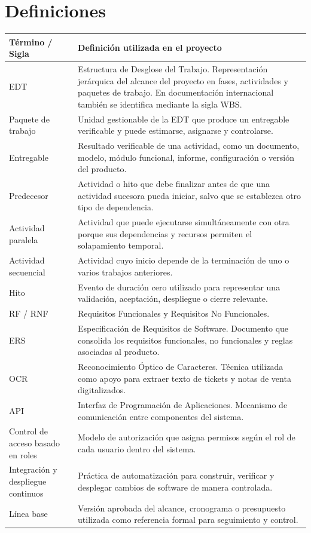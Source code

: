 \documentclass[12pt,a4paper]{article}
\begin{document}
\section{Definiciones}

\begin{longtable}{|p{4.0cm}|p{11.0cm}|}
\hline
\rowcolor{tableheader}
\textbf{Término / Sigla} & \textbf{Definición utilizada en el proyecto} \\ \hline
EDT & Estructura de Desglose del Trabajo. Representación jerárquica del alcance del proyecto en fases, actividades y paquetes de trabajo. En documentación internacional también se identifica mediante la sigla WBS. \\ \hline
Paquete de trabajo & Unidad gestionable de la EDT que produce un entregable verificable y puede estimarse, asignarse y controlarse. \\ \hline
Entregable & Resultado verificable de una actividad, como un documento, modelo, módulo funcional, informe, configuración o versión del producto. \\ \hline
Predecesor & Actividad o hito que debe finalizar antes de que una actividad sucesora pueda iniciar, salvo que se establezca otro tipo de dependencia. \\ \hline
Actividad paralela & Actividad que puede ejecutarse simultáneamente con otra porque sus dependencias y recursos permiten el solapamiento temporal. \\ \hline
Actividad secuencial & Actividad cuyo inicio depende de la terminación de uno o varios trabajos anteriores. \\ \hline
Hito & Evento de duración cero utilizado para representar una validación, aceptación, despliegue o cierre relevante. \\ \hline
RF / RNF & Requisitos Funcionales y Requisitos No Funcionales. \\ \hline
ERS & Especificación de Requisitos de Software. Documento que consolida los requisitos funcionales, no funcionales y reglas asociadas al producto. \\ \hline
OCR & Reconocimiento Óptico de Caracteres. Técnica utilizada como apoyo para extraer texto de tickets y notas de venta digitalizados. \\ \hline
API & Interfaz de Programación de Aplicaciones. Mecanismo de comunicación entre componentes del sistema. \\ \hline
Control de acceso basado en roles & Modelo de autorización que asigna permisos según el rol de cada usuario dentro del sistema. \\ \hline
Integración y despliegue continuos & Práctica de automatización para construir, verificar y desplegar cambios de software de manera controlada. \\ \hline
Línea base & Versión aprobada del alcance, cronograma o presupuesto utilizada como referencia formal para seguimiento y control. \\ \hline
\end{longtable}
\end{document}
